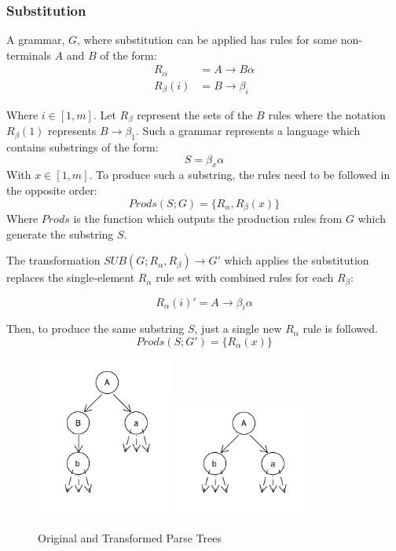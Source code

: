 \documentclass[11pt]{article}
\begin{document}
\subsubsection{Substitution}

A grammar, $G$, where substitution can be applied has rules for some non-terminals $A$ and $B$ of the form:
\begin{align*}
R_\alpha &= A \rightarrow B \alpha\\
R_\beta(i) &= B \rightarrow \beta_i
\end{align*}

Where $i \in [1,m]$. Let $R_\beta$ represent the sets of the $B$ rules where the notation
$R_\beta(1)$ represents $B \rightarrow \beta_1$. 
Such a grammar represents a language which contains substrings of the form:
\[ S = \beta_x \alpha\] 
With $x \in [1,m]$.
To produce such a substring, the rules need to be followed in the opposite order:
\[Prods(S;G) = \{R_\alpha, R_\beta(x)\}\]
Where $Prods$ is the function which outputs the production rules from $G$ which generate the substring $S$.

The transformation \cite{aho} $SUB(G; R_\alpha, R_\beta) \rightarrow G'$ which applies the substitution
replaces the single-element $R_\alpha$ rule set with combined rules for each $R_\beta$:

\[ R_\alpha(i)' = A \rightarrow \beta_i \alpha \]

Then, to produce the same substring $S$, just a single new $R_\alpha$ rule is followed. 
\[Prods(S;G') = \{R_\alpha(x)\}\]

\begin{figure}[h!]
    \centering
    \includegraphics[width=0.4\textwidth,natwidth=1,natheight=1]{umlet/sub_orig.pdf}
    \includegraphics[width=0.4\textwidth,natwidth=1,natheight=1]{umlet/sub_comp.pdf}
    \caption{Original and Transformed Parse Trees}
    \label{fig:dlre}
\end{figure}
\end{document}

